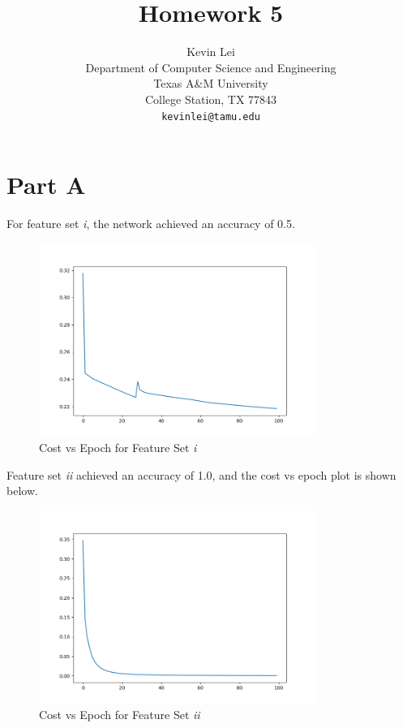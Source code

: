 \documentclass{article}
\title{Homework 5}
\author{
  Kevin Lei \\
  Department of Computer Science and Engineering \\
  Texas A\&M University \\
  College Station, TX 77843 \\
  \texttt{kevinlei@tamu.edu} \\
}
\begin{document}
\maketitle

\section{Part A}

For feature set \textit{i}, the network achieved an accuracy of 0.5.

\begin{figure}[H]
  \centering
  \includegraphics[width=0.8\textwidth]{Figure_1.png}
  \caption{Cost vs Epoch for Feature Set \textit{i}}
\end{figure}

Feature set \textit{ii} achieved an accuracy of 1.0, and the cost vs epoch plot is shown below.

\begin{figure}[H]
  \centering
  \includegraphics[width=0.8\textwidth]{Figure_2.png}
  \caption{Cost vs Epoch for Feature Set \textit{ii}}
\end{figure}
\end{document}
